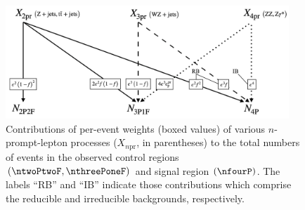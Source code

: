 \begin{figure}[!htbp]
	\begin{center}
		\includegraphics[width=0.95\textwidth]{figures/higgsmassmeas/redbkg/promptwgts_to_CRSR.png}
		\caption{
			Contributions of per-event weights (boxed values) of various $n$-prompt-lepton processes ($X_{n\text{pr}}$, in parentheses) to the total numbers of events in the observed control regions $\left( \ntwoPtwoF, \nthreePoneF \right)$ and signal region $\left( \nfourP \right)$.
			The labels ``RB'' and ``IB'' indicate those contributions which comprise the reducible and irreducible backgrounds, respectively.
		}
		\label{fig:prompt_to_crs}
	\end{center}
\end{figure}

